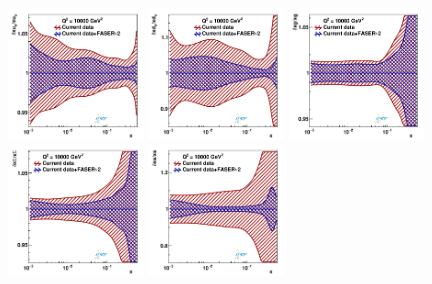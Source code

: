 \begin{figure}[t]
\centering
\includegraphics[width=0.32\textwidth]{plots/proton_fasernu2/inclusive+charm_chargediscrimination/statOnly_FASERv2_q2_10000_pdf_uv_ratio.pdf}
\includegraphics[width=0.32\textwidth]{plots/proton_fasernu2/inclusive+charm_chargediscrimination/statOnly_FASERv2_q2_10000_pdf_dv_ratio.pdf}
\includegraphics[width=0.32\textwidth]{plots/proton_fasernu2/inclusive+charm_chargediscrimination/statOnly_FASERv2_q2_10000_pdf_g_ratio.pdf}\\
\includegraphics[width=0.32\textwidth]{plots/proton_fasernu2/inclusive+charm_chargediscrimination/statOnly_FASERv2_q2_10000_pdf_Sea_ratio.pdf}
\includegraphics[width=0.32\textwidth]{plots/proton_fasernu2/inclusive+charm_chargediscrimination/statOnly_FASERv2_q2_10000_pdf_s_ratio.pdf}

\end{figure}
